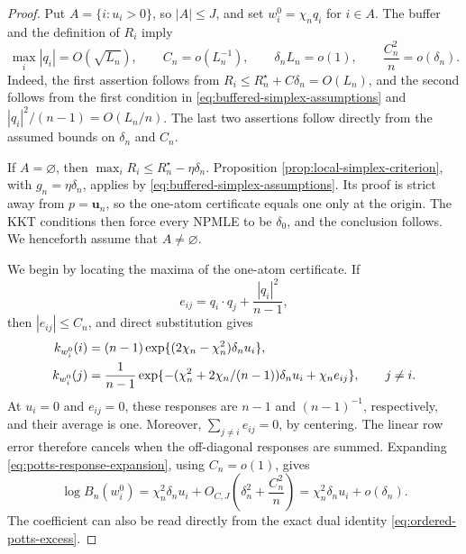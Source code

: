 \begin{proof}
Put \(A=\{i:u_i>0\}\), so \(|A|\le J\), and set
\(w_i^0=\chi_nq_i\) for \(i\in A\).  The buffer and the definition of
\(R_i\) imply
\begin{equation}
\label{eq:terminal-simplex-derived-rates}
 \max_i|q_i|=O(\sqrt{L_n}),
 \qquad
 C_n=o(L_n^{-1}),
 \qquad
 \delta_nL_n=o(1),
 \qquad
 \frac{C_n^2}{n}=o(\delta_n).
\end{equation}
Indeed, the first assertion follows from
\(R_i\le R_n^\star+C\delta_n=O(L_n)\), and the second follows from the
first condition in \eqref{eq:buffered-simplex-assumptions} and
\(|q_i|^2/(n-1)=O(L_n/n)\).  The last two assertions follow directly from
the assumed bounds on \(\delta_n\) and \(C_n\).

If \(A=\varnothing\), then
\(\max_iR_i\le R_n^\star-\eta\delta_n\).  Proposition
\ref{prop:local-simplex-criterion}, with \(g_n=\eta\delta_n\), applies by
\eqref{eq:buffered-simplex-assumptions}.  Its proof is strict away from
\(p=\mathbf u_n\), so the one-atom certificate equals one only at the
origin.  The KKT conditions then force every NPMLE to be \(\delta_0\), and
the conclusion follows.  We henceforth assume that \(A\ne\varnothing\).

We begin by locating the maxima of the one-atom certificate.  If
\[
 e_{ij}=q_i\cdot q_j+\frac{|q_i|^2}{n-1},
\]
then \(|e_{ij}|\le C_n\), and direct substitution gives
\begin{align}
\label{eq:potts-response-expansion}
 k_{w_i^0}(i)
 &= (n-1)\exp\{(2\chi_n-\chi_n^2)\delta_nu_i\},\notag\\
 k_{w_i^0}(j)
 &= \frac1{n-1}
    \exp\{-(\chi_n^2+2\chi_n/(n-1))\delta_nu_i
                 +\chi_ne_{ij}\},\qquad j\ne i.
\end{align}
At \(u_i=0\) and \(e_{ij}=0\), these responses are \(n-1\) and
\((n-1)^{-1}\), respectively, and their average is one.  Moreover,
\(\sum_{j\ne i}e_{ij}=0\), by centering.  The linear row error therefore
cancels when the off-diagonal responses are summed.  Expanding
\eqref{eq:potts-response-expansion}, using \(C_n=o(1)\), gives
\begin{equation}
\label{eq:potts-local-height}
 \log B_n(w_i^0)
 =\chi_n^2\delta_nu_i
  +O_{C,J}\left(\delta_n^2+\frac{C_n^2}{n}\right)
 =\chi_n^2\delta_nu_i+o(\delta_n).
\end{equation}
The coefficient can also be read directly from the exact dual identity
\eqref{eq:ordered-potts-excess}.


\end{proof}
